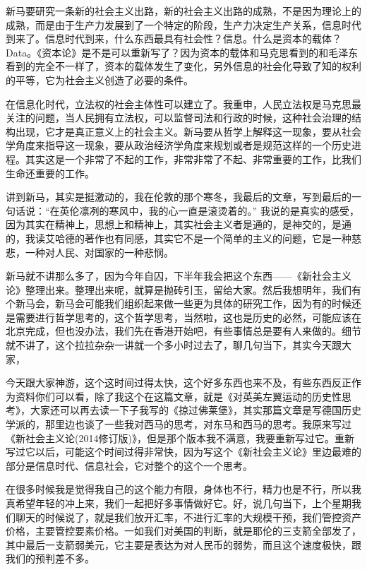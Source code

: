 \documentclass[UTF8, 12pt, a4paper]{ctexrep}
\begin{document}
新马要研究一条新的社会主义出路，新的社会主义出路的成熟，不是因为理论上的成熟，而是由于生产力发展到了一个特定的阶段，生产力决定生产关系，信息时代到来了。信息时代到来，什么东西最具有社会性？信息。什么是资本的载体？Data。《资本论》是不是可以重新写了？因为资本的载体和马克思看到的和毛泽东看到的完全不一样了，资本的载体发生了变化，另外信息的社会化导致了知的权利的平等，它为社会主义创造了必要的条件。

在信息化时代，立法权的社会主体性可以建立了。我重申，人民立法权是马克思最关注的问题，当人民拥有立法权，可以监督司法和行政的时候，这种社会治理的结构出现，它才是真正意义上的社会主义。新马要从哲学上解释这一现象，要从社会学角度来指导这一现象，要从政治经济学角度来规划或者是规范这样的一个历史进程。其实这是一个非常了不起的工作，非常非常了不起、非常重要的工作，比我们生命还重要的工作。

讲到新马，其实是挺激动的，我在伦敦的那个寒冬，我最后的文章，写到最后的一句话说：“在英伦凛冽的寒风中，我的心一直是滚烫着的。” 我说的是真实的感受，因为其实在精神上，思想上和精神上，其实社会主义者是通的，是神交的，是通的，我读艾哈德的著作也有同感，其实它不是一个简单的主义的问题，它是一种慈悲，一种对人民、对国家的一种悲悯。

新马就不讲那么多了，因为今年自囚，下半年我会把这个东西——《新社会主义论》整理出来。整理出来呢，就算是抛砖引玉，留给大家。然后我想明年，我们有个新马会，新马会可能我们组织起来做一些更为具体的研究工作，因为有的时候还是需要进行哲学思考的，这个哲学思考，当然啦，这也是历史的必然，可能应该在北京完成，但也没办法，我们先在香港开始吧，有些事情总是要有人来做的。细节就不讲了，这个拉拉杂杂一讲就一个多小时过去了，聊几句当下，其实今天跟大家，

今天跟大家神游，这个这时间过得太快，这个好多东西也来不及，有些东西反正作为资料你们可以看，除了我这个在这篇文章，就是《对英美左翼运动的历史性思考》，大家还可以再去读一下子我写的《掠过佛莱堡》，其实那篇文章是写德国历史学派的，那里边也谈了一些我对西马的思考，对东马和西马的思考。我原来写过《新社会主义论(2014修订版)》，但是那个版本我不满意，我要重新写过它。重新写过它以后，可能这个时间过得非常快，因为写这个《新社会主义论》里边最难的部分是信息时代、信息社会，它对整个的这个一个思考。

在很多时候我是觉得我自己的这个能力有限，身体也不行，精力也是不行，所以我真希望年轻的冲上来，我们一起把好多事情做好它。好，说几句当下，上个星期我们聊天的时候说了，就是我们放开汇率，不进行汇率的大规模干预，我们管控资产价格，主要管控要素价格。一如我们对美国的判断，就是耶伦的三支箭全部发了，其中最后一支箭弱美元，它主要是表达为对人民币的弱势，而且这个速度极快，跟我们的预判差不多。
\end{document}
